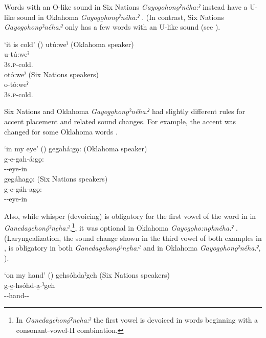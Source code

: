 Words with an O-like sound in Six Nations \textit{Gayogo̱honǫˀnéha:ˀ} instead have a U-like sound in Oklahoma \textit{Gayogo̱honǫˀnéha:ˀ} . (In contrast, Six Nations \textit{Gayogo̱honǫˀnéha:ˀ} only has a few words with an U-like sound (see ). 

\ea \label{ex:cold} ‘it is cold’ (\cite[250--251]{mithun_incipient_1989})
\ea utú:weˀ  (Oklahoma speaker)\\\label{ex:colda}
\gll u-tú:weˀ\\
\textsc{3s.p}-cold.{\stative}\\
\ex otó:weˀ (Six Nations speakers)\\\label{ex:coldb}
\gll o-tó:weˀ\\
\textsc{3s.p}-cold.{\stative} \\
\z
\z

Six Nations and Oklahoma \textit{Gayogo̱honǫˀnéha:}ˀ had slightly different rules for accent placement and related sound changes. For example, the accent was changed for some Oklahoma words . 

\ea\label{ex:eye} ‘in my eye’ (\cite[252]{mithun_incipient_1989})
\ea gegahá:gǫ: (Oklahoma speaker)\\\label{ex:eyea}
\gll g-e-gah-á:gǫ:\\
-{\joinerE}-eye-in\\

\ex\label{ex:eyeb}
gegáhagǫ:  (Six Nations speakers)\\
\gll g-e-gáh-agǫ:\\
-{\joinerE}-eye-in \\
\z
\z

Also, while whisper (devoicing) is obligatory for the first vowel of the word in  in \textit{Ganedagehonǫ́ˀne̱ha:ˀ},\footnote{In \textit{Ganedagehonǫ́ˀne̱ha:ˀ} the first vowel is devoiced in words beginning with a consonant-vowel-H combination.}, it was optional in Oklahoma \textit{Gayogo̱ho:\-nǫhnéha:ˀ} . (Laryngealization, the sound change shown in the third vowel of both examples in , is obligatory in both \textit{Ganedagehonǫ́ˀne̱ha:ˀ} and in Oklahoma \textit{Gayogo̱honǫˀnéha:ˀ}, \cite[254]{mithun_incipient_1989}).

\ea \label{ex:hand} ‘on my hand’ (\cite[253]{mithun_incipient_1989})
\ea ge̱hsóhda̱ˀgeh (Six Nations speakers)\\\label{ex:handa}
\gll g-e̱-hsóhd-a̱-ˀgeh\\
-{\joinerE}-hand-{\joinerA}-{\on}\\


